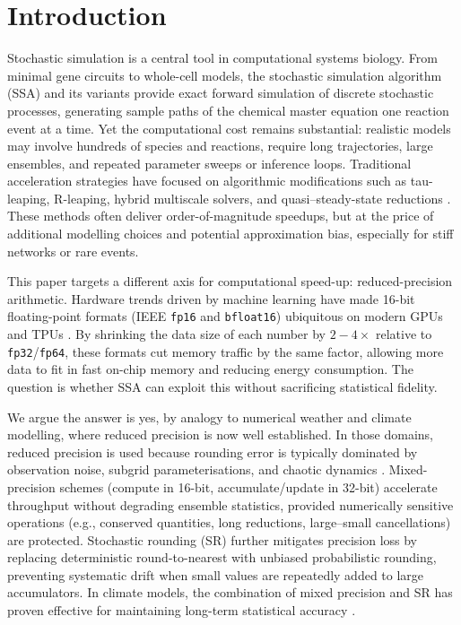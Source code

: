\documentclass{article}
\begin{document}
\section{Introduction}
Stochastic simulation is a central tool in computational systems biology. From minimal gene circuits to whole-cell models, the stochastic simulation algorithm (SSA) and its variants provide exact forward simulation of discrete stochastic processes, generating sample paths of the chemical master equation one reaction event at a time. Yet the computational cost remains substantial: realistic models may involve hundreds of species and reactions, require long trajectories, large ensembles, and repeated parameter sweeps or inference loops.
Traditional acceleration strategies have focused on algorithmic modifications such as tau-leaping, R-leaping, hybrid multiscale solvers, and quasi–steady-state reductions \cite{gillespie1977,anderson2007,cao2006,hybrid1,hybrid2}. These methods often deliver order-of-magnitude speedups, but at the price of additional modelling choices and potential approximation bias, especially for stiff networks or rare events.

This paper targets a different axis for computational speed-up: reduced-precision arithmetic. Hardware trends driven by machine learning have made 16-bit floating-point formats (IEEE \texttt{fp16} and \texttt{bfloat16}) ubiquitous on modern GPUs and TPUs \cite{jouppi2017,kalamkar2019}. By shrinking the data size of each number by $2-4\times$ relative to \texttt{fp32}/\texttt{fp64}, these formats cut memory traffic by the same factor, allowing more data to fit in fast on-chip memory and reducing energy consumption. The question is whether SSA can exploit this without sacrificing statistical fidelity.

We argue the answer is yes, by analogy to numerical weather and climate modelling, where reduced precision is now well established. In those domains, reduced precision is used because rounding error is typically dominated by observation noise, subgrid parameterisations, and chaotic dynamics \cite{palmer2015,chantry2019,dawson2018}. Mixed-precision schemes (compute in 16-bit, accumulate/update in 32-bit) accelerate throughput without degrading ensemble statistics, provided numerically sensitive operations (e.g., conserved quantities, long reductions, large–small cancellations) are protected. Stochastic rounding (SR) \cite{parker1997,connolly2021,croci2022,croci2022review,kimpson2024} further mitigates precision loss by replacing deterministic round-to-nearest with unbiased probabilistic rounding, preventing systematic drift when small values are repeatedly added to large accumulators. In climate models, the combination of mixed precision and SR has proven effective for maintaining long-term statistical accuracy \cite{thornes2017,paxton2022}.
\end{document}

